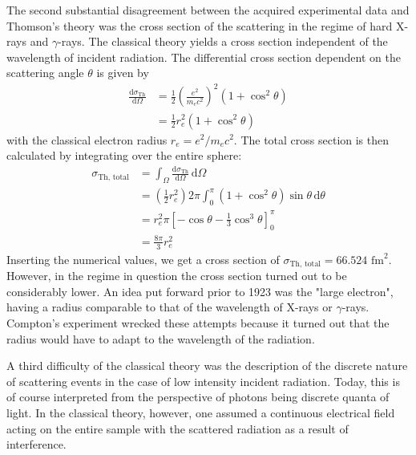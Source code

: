 The second substantial disagreement between the acquired experimental data and Thomson's theory was the cross section of 
the scattering in the regime of hard X-rays and $\gamma$-rays. The classical theory yields a cross section independent of 
the wavelength of incident radiation. The differential cross section dependent on the scattering angle $\theta$ is given by
\begin{equation}
    \begin{split}
        \frac{\text{d} \sigma_\text{Th}}{\text{d} \Omega} 
        &= \frac{1}{2} \left(\frac{e^2}{m_e c^2}\right)^2 \left(1 + \cos^2 \theta  \right)  \\
        &= \frac{1}{2} r_e^2 \left(1 + \cos^2 \theta  \right) 
        \label{eq:thomson}
    \end{split}
\end{equation}
with the classical electron radius $r_e = e^2/m_e c^2$. 
The total cross section is then calculated by integrating over the entire sphere:
\begin{equation}
    \begin{split}
        \sigma_\text{Th, total} &= \int_\Omega \! \frac{\text{d} \sigma_\text{Th}}{\text{d} \Omega}  \, \text{d}\Omega \\
            &= \left(\frac{1}{2} r_e^2\right)  2\pi \int_0^\pi \! \left(1 + \cos^2\theta\right)\sin\theta \, \text{d}\theta \\
            &= r_e^2\pi \left[ -\cos\theta -\frac{1}{3}\cos^3\theta \right]_0^\pi \\
            &= \frac{8\pi}{3} r_e^2 
        \label{eq:total_thomson}
    \end{split}
\end{equation}
Inserting the numerical values, we get a cross section of $\sigma_\text{Th, total} = 66.524 \text{ fm}^2$. 
However, in the regime in question the cross section turned out to be considerably lower. An idea put forward prior to 
1923 was the "large electron", having a radius comparable to that of the wavelength of X-rays or $\gamma$-rays. Compton's
experiment wrecked these attempts because it turned out that the radius would have to adapt to the wavelength of the 
radiation.\cite{compton}   

A third difficulty of the classical theory was the description of the discrete nature of scattering events in the case of 
low intensity incident radiation. Today, this is of course interpreted from the perspective of photons being discrete 
quanta of light. In the classical theory, however, one assumed a continuous electrical field acting on the entire sample
with the scattered radiation as a result of interference. 

